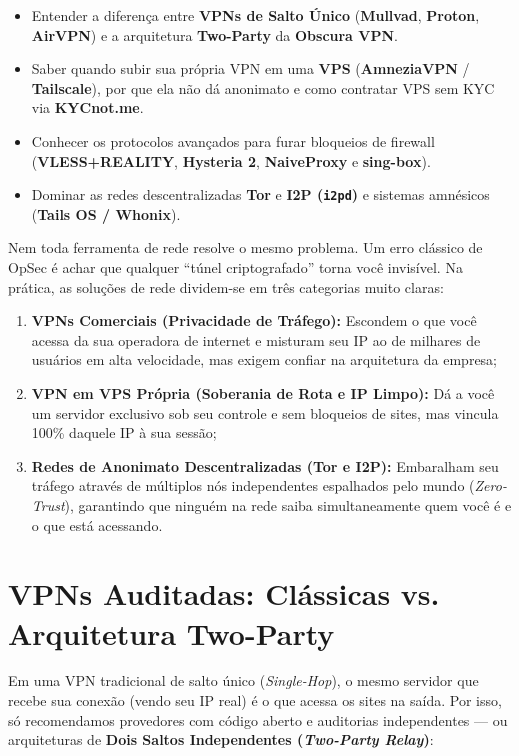 \documentclass{pousadaguide}
\begin{document}
\begin{missao}
\begin{itemize}
  \item Entender a diferença entre \textbf{VPNs de Salto Único} (\textbf{Mullvad}, \textbf{Proton}, \textbf{AirVPN}) e a arquitetura \textbf{Two-Party} da \textbf{Obscura VPN}.
  \item Saber quando subir sua própria VPN em uma \textbf{VPS} (\textbf{AmneziaVPN} / \textbf{Tailscale}), por que ela não dá anonimato e como contratar VPS sem KYC via \textbf{KYCnot.me}.
  \item Conhecer os protocolos avançados para furar bloqueios de firewall (\textbf{VLESS+REALITY}, \textbf{Hysteria 2}, \textbf{NaiveProxy} e \textbf{sing-box}).
  \item Dominar as redes descentralizadas \textbf{Tor} e \textbf{I2P (\texttt{i2pd})} e sistemas amnésicos (\textbf{Tails OS / Whonix}).
\end{itemize}
\end{missao}

Nem toda ferramenta de rede resolve o mesmo problema. Um erro clássico de OpSec é achar que qualquer ``túnel criptografado'' torna você invisível. Na prática, as soluções de rede dividem-se em três categorias muito claras:
\begin{enumerate}
  \item \textbf{VPNs Comerciais (Privacidade de Tráfego):} Escondem o que você acessa da sua operadora de internet e misturam seu IP ao de milhares de usuários em alta velocidade, mas exigem confiar na arquitetura da empresa;
  \item \textbf{VPN em VPS Própria (Soberania de Rota e IP Limpo):} Dá a você um servidor exclusivo sob seu controle e sem bloqueios de sites, mas vincula 100\% daquele IP à sua sessão;
  \item \textbf{Redes de Anonimato Descentralizadas (Tor e I2P):} Embaralham seu tráfego através de múltiplos nós independentes espalhados pelo mundo (\emph{Zero-Trust}), garantindo que ninguém na rede saiba simultaneamente quem você é e o que está acessando.
\end{enumerate}

\section{VPNs Auditadas: Clássicas vs. Arquitetura Two-Party}

Em uma VPN tradicional de salto único (\emph{Single-Hop}), o mesmo servidor que recebe sua conexão (vendo seu IP real) é o que acessa os sites na saída. Por isso, só recomendamos provedores com código aberto e auditorias independentes — ou arquiteturas de \textbf{Dois Saltos Independentes (\emph{Two-Party Relay})}:
\end{document}
